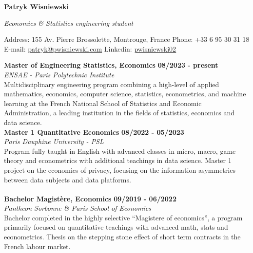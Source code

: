 \documentclass[11pt]{report}
\begin{document}
\hspace*{-\parindent}\hspace{-1em}
\begin{center}
\begin{Large}\textbf{Patryk Wisniewski\\}\end{Large}
\emph{Economics \& Statistics engineering student}
\end{center}\vspace{0.1cm}
	 Address: 155 Av. Pierre Brossolette, Montrouge, France \hfill Phone: +33 6 95 30 31 18 
	 \newline E-mail: \href{mailto:patryk@pwisniewski.com}{\underline{patryk@pwisniewski.com}} \hfill
	 Linkedin: \href{https://linkedin.com/in/pwisniewski02}{\underline{pwisniewski02}}


	\begin{flushleft}
	\raisebox{-.6ex}{HIGHER EDUCATION} \hrulefill
	\end{flushleft}

	
\noindent\textbf{Master of Engineering \textbar\space Statistics,  Economics}
\hfill
\textbf{08/2023 - present} \\
\emph{ENSAE - Paris Polytechnic Institute}\\
Multidisciplinary engineering program combining a high-level of applied mathematics, economics, computer science, statistics, econometrics, and machine learning at the French National School of Statistics and Economic Administration, a leading institution in the fields of statistics, economics and data science.  \\

\noindent\textbf{Master 1 \textbar\space Quantitative Economics}
\hfill
\textbf{08/2022 - 05/2023} \\
\emph{Paris Dauphine University - PSL}\\
Program fully taught in English with advanced classes in micro, macro, game theory and econometrics  with additional teachings in data science. Master 1 project on the economics of privacy, focusing on the information asymmetries between data subjects and data platforms. \\
\\
\noindent\textbf{Bachelor \textbar\space Magistère, Economics}
\hfill
\textbf{09/2019 - 06/2022} \\
\emph{Pantheon Sorbonne \& Paris School of Economics}\\
Bachelor completed in the highly selective “Magistere of economics”, a program primarily focused on quantitative teachings with advanced math, stats and econometrics. Thesis on the stepping stone effect of short term contracts in the French labour market. 
\end{document}
